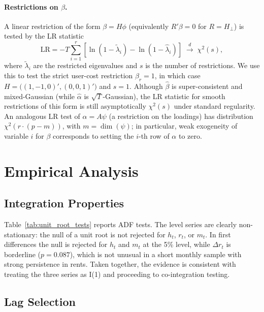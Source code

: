 \documentclass[12pt]{article}
\begin{document}
\paragraph{Restrictions on $\beta$.} A linear restriction of the form $\beta = H\phi$ (equivalently $R'\beta=0$ for $R=H_\perp$) is tested by the LR statistic
\[
\mathrm{LR} = -T\sum_{i=1}^{r}\!\left[\ln(1-\tilde\lambda_i)-\ln(1-\hat\lambda_i)\right]\;\stackrel{d}{\to}\;\chi^2(s),
\]
where $\tilde\lambda_i$ are the restricted eigenvalues and $s$ is the number of restrictions. We use this to test the strict user-cost restriction $\beta_r=1$, in which case $H=\bigl((1,-1,0)',(0,0,1)'\bigr)$ and $s=1$. Although $\hat\beta$ is super-consistent and mixed-Gaussian (while $\hat\alpha$ is $\sqrt{T}$-Gaussian), the LR statistic for smooth restrictions of this form is still asymptotically $\chi^2(s)$ under standard regularity. An analogous LR test of $\alpha = A\psi$ (a restriction on the loadings) has distribution $\chi^2(r\cdot(p-m))$, with $m=\dim(\psi)$; in particular, weak exogeneity of variable $i$ for $\beta$ corresponds to setting the $i$-th row of $\alpha$ to zero.

\section{Empirical Analysis}\label{sec:p2-empirical}

\subsection{Integration Properties}

Table~\ref{tab:unit_root_tests} reports ADF tests. The level series are clearly non-stationary: the null of a unit root is not rejected for $h_t$, $r_t$, or $m_t$. In first differences the null is rejected for $h_t$ and $m_t$ at the 5\% level, while $\Delta r_t$ is borderline ($p=0.087$), which is not unusual in a short monthly sample with strong persistence in rents. Taken together, the evidence is consistent with treating the three series as I(1) and proceeding to co-integration testing.



\subsection{Lag Selection}
\end{document}
